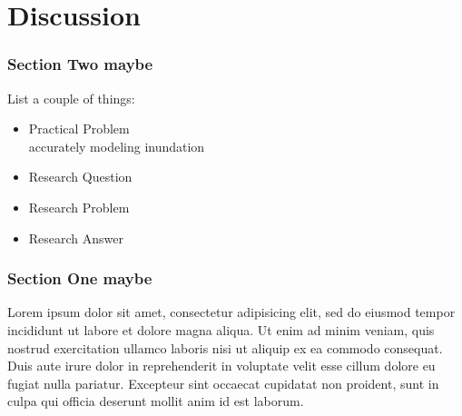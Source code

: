 \documentclass{beamer}
\begin{document}
\section{Discussion}
\begin{frame}
\frametitle{Section Two maybe}
List a couple of things:

\begin{itemize}
  \item Practical Problem\\
  accurately modeling inundation
  \item Research Question
  \item Research Problem
  \item Research Answer
\end{itemize}
\end{frame}


\begin{frame}
  \frametitle{Section One maybe}
  Lorem ipsum dolor sit amet, consectetur adipisicing elit, sed do eiusmod
  tempor incididunt ut labore et dolore magna aliqua. Ut enim ad minim veniam,
  quis nostrud exercitation ullamco laboris nisi ut aliquip ex ea commodo
  consequat. Duis aute irure dolor in reprehenderit in voluptate velit esse
  cillum dolore eu fugiat nulla pariatur. Excepteur sint occaecat cupidatat non
  proident, sunt in culpa qui officia deserunt mollit anim id est laborum. 
  \end{frame}



\end{document}
